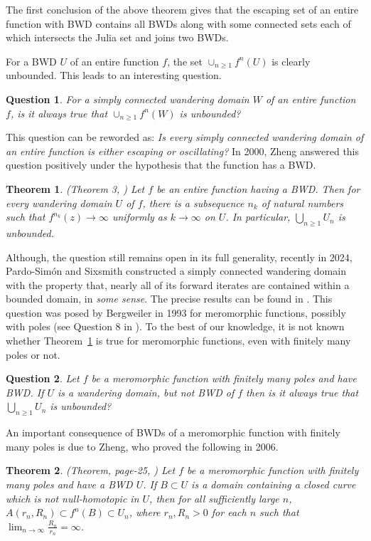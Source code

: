 \documentclass[11pt,a4paper]{article}
\newtheorem{theorem}{Theorem}[section]
\newtheorem{Question}{Question}
\begin{document}
	The first conclusion of the above theorem gives that the escaping set of an entire function with BWD contains all BWDs along with some connected sets each of which intersects the Julia set and joins two BWDs. 
	\par For a BWD $U$ of an entire function $f$, the set $\cup_{n\geq 1}f^n(U)$ is clearly unbounded. This leads to an interesting question.
	\begin{Question}
	For a simply connected wandering domain  $W$ of an entire function $f$, is it always true that  $\cup_{n\geq 1}f^n(W)$ is unbounded?
	\label{WD-orbunbded}
	\end{Question} 
	This question can be reworded as: \textit{Is every simply connected wandering domain of an entire function is either escaping or oscillating?} In 2000, Zheng answered this question positively under the hypothesis  that the function has a BWD.
	\begin{theorem}(Theorem 3, \cite{Zheng 2000})
		Let $f$ be an  entire function having a BWD. Then for every wandering domain $U$ of $f$, there is a subsequence $ {n_k}$ of natural numbers such that $f^{n_k}(z)\to\infty$ uniformly as $k \to \infty$ on $U$. In particular, $\bigcup_{n \geq 1}U_n$ is unbounded.
	\label{scwd-bded}
	\end{theorem} 
Although, the question still remains open in its full generality, recently in 2024, Pardo-Sim\'on and Sixsmith constructed a simply connected wandering domain with the property that,  nearly all of its forward iterates are
	contained within a bounded domain,  in \textit{some sense}. The precise results  can be found in \cite{Simon Sixsmith 2024}.	This question was posed by Bergweiler in 1993 for meromorphic functions, possibly with poles (see Question 8 in \cite{Berg 1993}). To the best of  our knowledge, it is not known whether Theorem~\ref{scwd-bded} is true for meromorphic functions, even with finitely many poles or not.
	\begin{Question}
		Let $f$ be a meromorphic function with finitely many poles and have BWD. If $U$ is a wandering domain, but not BWD of $f$ then is it always true that $\bigcup_{n \geq 1}U_n$ is unbounded?
	\end{Question}
	\par
	An important consequence of BWDs of a meromorphic function   with finitely many poles is due to Zheng, who proved the following in 2006.
	\begin{theorem}(Theorem, page-25,  \cite{Zheng 2006}\label{Thm15})
	 	Let $f$ be a meromorphic function with finitely many poles and have a BWD $U$.  If $B\subset U$ is a domain   containing a closed curve which is not null-homotopic in $U$, then for all sufficiently large $n$, $A(r_n, R_n)\subset f^n(B)\subset U_n$, where $r_n, R_n >0$ for each $n$ such that  $\lim_{n \to \infty}\frac{R_n}{r_n} = \infty$. 
	\end{theorem}
\end{document}
